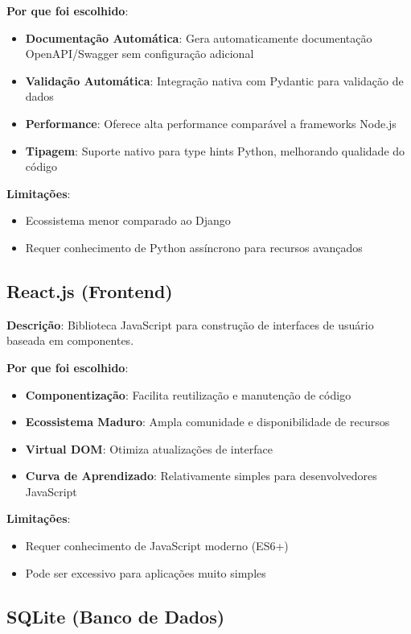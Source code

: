 \documentclass[12pt,a4paper]{article}
\begin{document}
\textbf{Por que foi escolhido}:
\begin{itemize}
    \item \textbf{Documentação Automática}: Gera automaticamente documentação OpenAPI/Swagger sem configuração adicional
    \item \textbf{Validação Automática}: Integração nativa com Pydantic para validação de dados
    \item \textbf{Performance}: Oferece alta performance comparável a frameworks Node.js
    \item \textbf{Tipagem}: Suporte nativo para type hints Python, melhorando qualidade do código
\end{itemize}

\textbf{Limitações}:
\begin{itemize}
    \item Ecossistema menor comparado ao Django
    \item Requer conhecimento de Python assíncrono para recursos avançados
\end{itemize}

\subsection{React.js (Frontend)}

\textbf{Descrição}: Biblioteca JavaScript para construção de interfaces de usuário baseada em componentes.

\textbf{Por que foi escolhido}:
\begin{itemize}
    \item \textbf{Componentização}: Facilita reutilização e manutenção de código
    \item \textbf{Ecossistema Maduro}: Ampla comunidade e disponibilidade de recursos
    \item \textbf{Virtual DOM}: Otimiza atualizações de interface
    \item \textbf{Curva de Aprendizado}: Relativamente simples para desenvolvedores JavaScript
\end{itemize}

\textbf{Limitações}:
\begin{itemize}
    \item Requer conhecimento de JavaScript moderno (ES6+)
    \item Pode ser excessivo para aplicações muito simples
\end{itemize}

\subsection{SQLite (Banco de Dados)}
\end{document}
